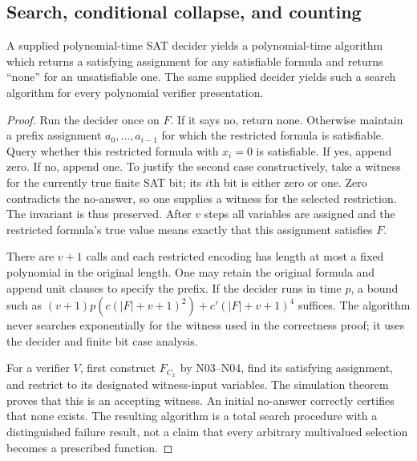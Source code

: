 \subsection{Search, conditional collapse, and counting}

\begin{theorem}\label{thm:N15}
A supplied polynomial-time SAT decider yields a polynomial-time algorithm
which returns a satisfying assignment for any satisfiable formula and returns
``none'' for an unsatisfiable one. The same supplied decider yields such a
search algorithm for every polynomial verifier presentation.
\end{theorem}
\begin{proof}
Run the decider once on $F$. If it says no, return none. Otherwise maintain a
prefix assignment $a_0,\ldots,a_{i-1}$ for which the restricted formula is
satisfiable. Query whether this restricted formula with $x_i=0$ is
satisfiable. If yes, append zero. If no, append one. To justify the second
case constructively, take a witness for the currently true finite SAT bit;
its $i$th bit is either zero or one. Zero contradicts the no-answer, so one
supplies a witness for the selected restriction. The invariant is thus
preserved. After $v$ steps all variables are assigned and the restricted
formula's true value means exactly that this assignment satisfies $F$.

There are $v+1$ calls and each restricted encoding has length at most a fixed
polynomial in the original length. One may retain the original formula and
append unit clauses to specify the prefix. If the decider runs in time $p$,
a bound such as $(v+1)p(c(|F|+v+1)^2)+c'(|F|+v+1)^4$ suffices. The algorithm
never searches exponentially for the witness used in the correctness proof;
it uses the decider and finite bit case analysis.

For a verifier $V$, first construct $F_{C_x}$ by N03--N04, find its satisfying
assignment, and restrict to its designated witness-input variables. The
simulation theorem proves that this is an accepting witness. An initial
no-answer correctly certifies that none exists. The resulting algorithm is
a total search procedure with a distinguished failure result, not a claim
that every arbitrary multivalued selection becomes a prescribed function.
\end{proof}

